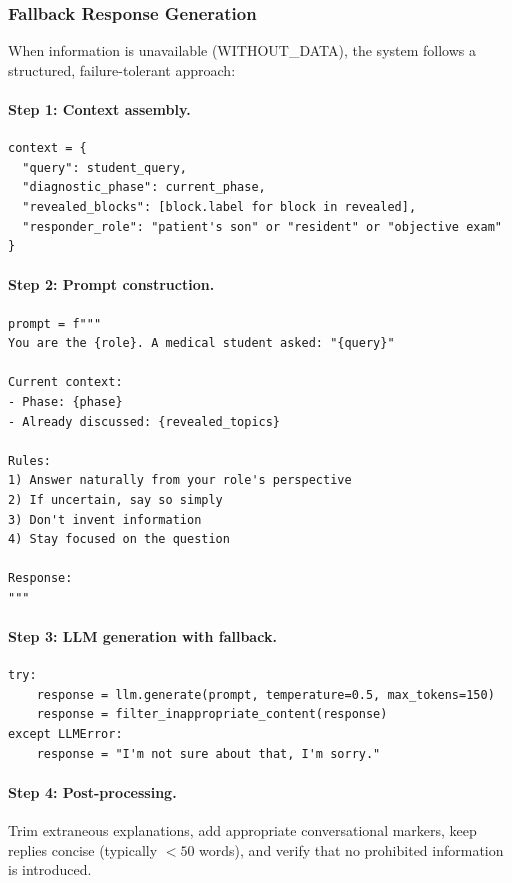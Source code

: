 \subsubsection{Fallback Response Generation}
\label{sec:fallback_generation}

When information is unavailable (WITHOUT\_DATA), the system follows a structured,
failure-tolerant approach:

\paragraph{Step 1: Context assembly.}
\begin{verbatim}
context = {
  "query": student_query,
  "diagnostic_phase": current_phase,
  "revealed_blocks": [block.label for block in revealed],
  "responder_role": "patient's son" or "resident" or "objective exam"
}
\end{verbatim}

\paragraph{Step 2: Prompt construction.}
\begin{verbatim}
prompt = f"""
You are the {role}. A medical student asked: "{query}"

Current context:
- Phase: {phase}
- Already discussed: {revealed_topics}

Rules:
1) Answer naturally from your role's perspective
2) If uncertain, say so simply
3) Don't invent information
4) Stay focused on the question

Response:
"""
\end{verbatim}

\paragraph{Step 3: LLM generation with fallback.}
\begin{verbatim}
try:
    response = llm.generate(prompt, temperature=0.5, max_tokens=150)
    response = filter_inappropriate_content(response)
except LLMError:
    response = "I'm not sure about that, I'm sorry."
\end{verbatim}

\paragraph{Step 4: Post-processing.}
Trim extraneous explanations, add appropriate conversational markers, keep replies
concise (typically $<50$ words), and verify that no prohibited information is
introduced.

